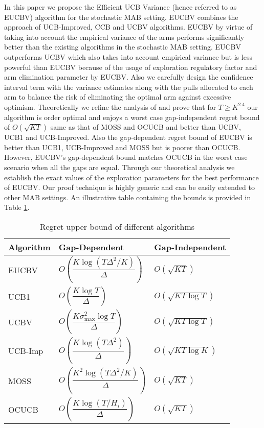 In this paper we propose the Efficient UCB Variance (hence referred to as EUCBV) algorithm for the stochastic MAB setting. EUCBV combines the approach of UCB-Improved, CCB \citep{liu2016modification} and UCBV algorithms. EUCBV by virtue of taking into account the empirical variance of the arms performs significantly better than the existing algorithms in the stochastic MAB setting. EUCBV outperforms UCBV \citep{audibert2009exploration} which also takes into account empirical variance but is less powerful than EUCBV because of the usage of exploration regulatory factor and arm elimination parameter by EUCBV. Also we carefully design the confidence interval term with the variance estimates along with the pulls allocated to each arm to balance the risk of eliminating the optimal arm against excessive optimism.   Theoretically we refine the analysis of \citet{auer2010ucb} and prove that for $T\geq K^{2.4}$ our algorithm is order optimal and enjoys a worst case gap-independent regret bound of $O\left( \sqrt{KT} \right)$ same as that of MOSS and OCUCB and better than UCBV, UCB1 and UCB-Improved. Also the gap-dependent regret bound of EUCBV is better than UCB1, UCB-Improved and MOSS but is poorer than OCUCB. However, EUCBV's gap-dependent bound matches OCUCB in the worst case scenario when all the gaps are equal. Through our theoretical analysis we establish the exact values of the exploration parameters for the best performance of EUCBV. Our proof technique is highly generic and can be easily extended to other MAB settings. An illustrative table containing the bounds is provided in Table \ref{tab:comp-bds}. 

\begin{table}
\caption{Regret upper bound of different algorithms}
\label{tab:comp-bds}
\begin{center}
\begin{tabular}{p{6em}p{12em}p{10em}}
\toprule
Algorithm  & Gap-Dependent & Gap-Independent \\
\hline
EUCBV		& $O\left( \dfrac{K\log (T\Delta^2 /K)}{\Delta}\right)$ & $O\left(\sqrt{KT}\right)$\\
UCB1        & $O\left( \dfrac{K\log T}{\Delta} \right)$ & $O\left(\sqrt{KT\log T}\right)$ \\%
UCBV        & $O\left( \dfrac{K\sigma_{\max}^{2}\log T}{\Delta} \right)$ & $O\left(\sqrt{KT\log T}\right)$ \\
UCB-Imp 		& $O\left( \dfrac{K\log (T\Delta^2)}{\Delta} \right)$ & $O\left(\sqrt{KT\log K}\right)$ \\%
MOSS	     	& $O\left( \dfrac{K^2\log (T\Delta^2 /K)}{\Delta}\right)$ & $O\left(\sqrt{KT}\right)$\\%
OCUCB     	& $O\left( \dfrac{K\log (T/ H_{i})}{\Delta}\right)$ & $O\left(\sqrt{KT}\right)$\\\midrule
\end{tabular}
\end{center}
\vspace*{-2em}
\end{table}

